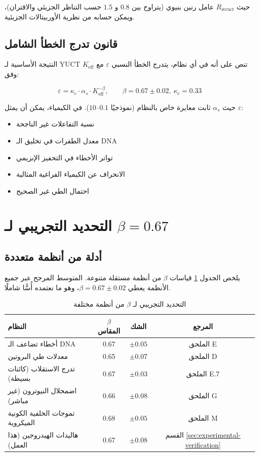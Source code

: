 \documentclass[12pt,a4paper]{article}
\theoremstyle{remark}
\newcommand{\Keff}{K_{\mathrm{eff}}}
\newcommand{\kappac}{\kappa_c}
\newcommand{\eps}{\varepsilon}
\newcommand{\Rstruct}{R_{\mathrm{struct}}}
\begin{document}
	حيث $\Rstruct$ عامل رنين بنيوي (يتراوح بين $0.8$ و $1.5$ حسب التناظر الجزيئي والاقتران)، ويمكن حسابه من نظرية الأوربيتالات الجزيئية.
	
	\subsection{قانون تدرج الخطأ الشامل}
	
	النتيجة الأساسية لـ YUCT تنص على أنه في أي نظام، يتدرج الخطأ النسبي $\eps$ مع $\Keff$ وفق:
	
	\begin{equation}
		\boxed{\eps = \kappac \cdot \alpha_s \cdot \Keff^{-\beta}, \qquad \beta = 0.67 \pm 0.02, \ \kappac = 0.33}
		\label{eq:universal-error}
	\end{equation}
	
	حيث $\alpha_s$ ثابت معايرة خاص بالنظام (نموذجيًا $0.1$–$10$). في الكيمياء، يمكن أن يمثل $\eps$:
	\begin{itemize}
		\item نسبة التفاعلات غير الناجحة
		\item معدل الطفرات في تخليق الـ DNA
		\item تواتر الأخطاء في التحفيز الإنزيمي
		\item الانحراف عن الكيمياء الفراغية المثالية
		\item احتمال الطي غير الصحيح
	\end{itemize}
	
	\section{التحديد التجريبي لـ $\beta = 0.67$}
	\label{sec:empirical-beta}
	
	\subsection{أدلة من أنظمة متعددة}
	
	يلخص الجدول \ref{tab:beta-empirical} قياسات $\beta$ من أنظمة مستقلة متنوعة. المتوسط المرجح عبر جميع الأنظمة يعطي $\beta = 0.67 \pm 0.02$، وهو ما نعتمده أُسًّا شاملًا.
	
	\begin{table}[htbp]
		\centering
		\caption{التحديد التجريبي لـ $\beta$ من أنظمة مختلفة}
		\label{tab:beta-empirical}
		\begin{tabular}{lccc}
			\toprule
			النظام & $\beta$ المقاس & الشك & المرجع \\
			\midrule
			أخطاء تضاعف الـ DNA & 0.67 & $\pm 0.05$ & الملحق E \\
			معدلات طي البروتين & 0.65 & $\pm 0.07$ & الملحق D \\
			تدرج الاستقلاب (كائنات بسيطة) & 0.67 & $\pm 0.03$ & الملحق E.7 \\
			اضمحلال النيوترون (غير مباشر) & 0.66 & $\pm 0.08$ & الملحق G \\
			تموجات الخلفية الكونية الميكروية & 0.68 & $\pm 0.05$ & الملحق M \\
			هاليدات الهيدروجين (هذا العمل) & 0.67 & $\pm 0.08$ & القسم \ref{sec:experimental-verification} \\
			\bottomrule
		\end{tabular}
	\end{table}
	
\end{document}
